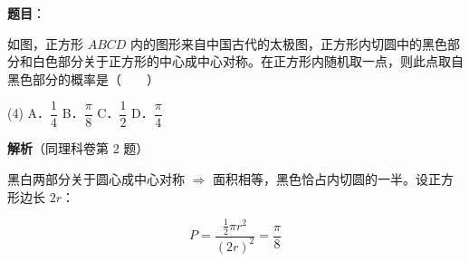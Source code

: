 \begin{answer}

\textbf{题目}：

如图，正方形 $ABCD$ 内的图形来自中国古代的太极图，正方形内切圆中的黑色部分和白色部分关于正方形的中心成中心对称。在正方形内随机取一点，则此点取自黑色部分的概率是\mbox{（　　）}
\nopagebreak[4]
\begin{center}\end{center}
\nopagebreak[4]
\begin{gkopts}(4)
\task A．$\dfrac14$
\task B．$\dfrac\pi8$
\task C．$\dfrac12$
\task D．$\dfrac\pi4$
\end{gkopts}

\textbf{解析}（同理科卷第 2 题）

黑白两部分关于圆心成中心对称 $\Rightarrow$ 面积相等，黑色恰占内切圆的一半。设正方形边长 $2r$：

\nopagebreak[4]
\[P=\frac{\frac12\pi r^{2}}{(2r)^{2}}=\frac\pi8\]


\par\medskip

\end{answer}
